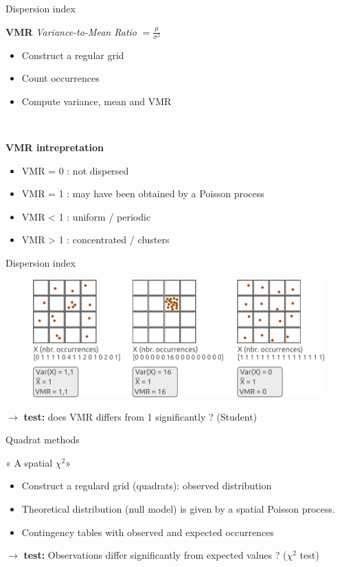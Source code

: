 \begin{frame}{Dispersion index}

\textbf{VMR} \textit{Variance-to-Mean Ratio} $=\frac{\mu}{\sigma^2}$

\begin{itemize}
\item Construct a regular grid 
\item Count occurrences
\item Compute variance,  mean and VMR
\end{itemize}

~

\textbf{VMR intrepretation}

\begin{itemize}
  \item VMR = 0 : not dispersed 
  \item VMR = 1 : may have been obtained by a Poisson process
  \item VMR < 1 : uniform / periodic
  \item VMR > 1 : concentrated / clusters
\end{itemize}

\end{frame}


\begin{frame}{Dispersion index}

\begin{figure}
  \includegraphics[width=12cm]{VMR.pdf}
\end{figure}

$\rightarrow$ \textbf{test:}  does VMR differs from 1 significantly ? (Student)

\end{frame}


\begin{frame}{Quadrat methods}

« A spatial $\chi^2$»

\begin{itemize}
  \item Construct a regulard grid (quadrats): observed distribution 
  \item Theoretical distribution (null model) is given by a spatial Poisson process.
  \item Contingency tables with  observed and expected occurrences
\end{itemize}

$\rightarrow$ \textbf{test:} Observations differ significantly from expected values ?  ($\chi^2$ test)

\end{frame}

